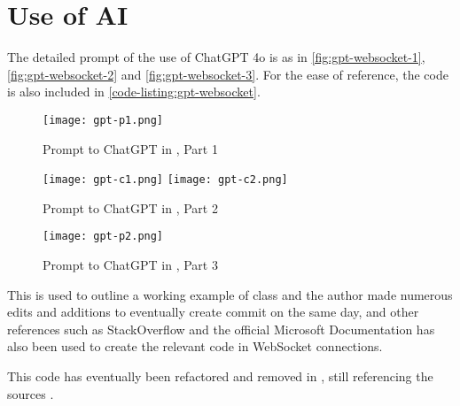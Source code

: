 \chapter{Use of AI}
The detailed prompt of the use of ChatGPT 4o \autocite{gpt-websocket} is as in \autoref{fig:gpt-websocket-1}, \autoref{fig:gpt-websocket-2} and \autoref{fig:gpt-websocket-3}. For the ease of reference, the code is also included in \autoref{code-listing:gpt-websocket}.

\begin{figure}[htp]
    \centering

    \texttt{[image: gpt-p1.png]}
    \caption[Prompt to ChatGPT in \autocite{gpt-websocket}, Part 1]{Prompt to ChatGPT in \autocite{gpt-websocket}, Part 1}
    \label{fig:gpt-websocket-1}
\end{figure}

\begin{figure}[htp]
    \centering

    \texttt{[image: gpt-c1.png]}
    \texttt{[image: gpt-c2.png]}

    \caption[Prompt to ChatGPT in \autocite{gpt-websocket}, Part 2]{Prompt to ChatGPT in \autocite{gpt-websocket}, Part 2}
    \label{fig:gpt-websocket-2}
\end{figure}

\begin{figure}[htp]
    \centering

    \texttt{[image: gpt-p2.png]}

    \caption[Prompt to ChatGPT in \autocite{gpt-websocket}, Part 3]{Prompt to ChatGPT in \autocite{gpt-websocket}, Part 3}
    \label{fig:gpt-websocket-3}
\end{figure}

This is used to outline a working example of  class and the author made numerous edits and additions to eventually create commit  on the same day, and other references such as StackOverflow \autocite{stackoverflow-websocket-demo, stackoverflow-websocket-demo-2} and the official Microsoft Documentation \autocite{dotnet-reference-clientwebsocket} has also been used to create the relevant code in WebSocket connections.

This code has eventually been refactored and removed in , still referencing the sources \autocite{stackoverflow-websocket-demo, stackoverflow-websocket-demo-2}.